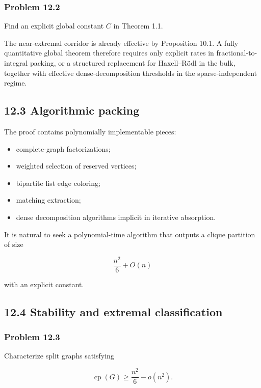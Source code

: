 \documentclass[11pt,a4paper]{article}
\providecommand{\tightlist}{\setlength{\itemsep}{0pt}\setlength{\parskip}{0pt}}
\begin{document}
\subsubsection{Problem 12.2}\label{problem-12.2}

Find an explicit global constant \(C\) in Theorem 1.1.

The near-extremal corridor is already effective by Proposition 10.1. A fully quantitative global theorem therefore requires only explicit rates in fractional-to-integral packing, or a structured replacement for Haxell--Rödl in the bulk, together with effective dense-decomposition thresholds in the sparse-independent regime.

\subsection{12.3 Algorithmic packing}\label{algorithmic-packing}

The proof contains polynomially implementable pieces:

\begin{itemize}
\tightlist
\item
  complete-graph factorizations;
\item
  weighted selection of reserved vertices;
\item
  bipartite list edge coloring;
\item
  matching extraction;
\item
  dense decomposition algorithms implicit in iterative absorption.
\end{itemize}

It is natural to seek a polynomial-time algorithm that outputs a clique partition of size

\[
\frac{n^2}{6}+O(n)
\]

with an explicit constant.

\subsection{12.4 Stability and extremal classification}\label{stability-and-extremal-classification}

\subsubsection{Problem 12.3}\label{problem-12.3}

Characterize split graphs satisfying

\[
\operatorname{cp}(G)
\ge
\frac{n^2}{6}-o(n^2).
\]
\end{document}

